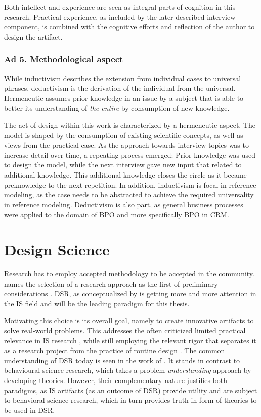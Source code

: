 Both intellect and experience are seen as integral parts of cognition in this research. Practical experience, as included by the later described interview component, is combined with the cognitive efforts and reflection of the author to design the artifact. 

\subsubsection{Ad 5. Methodological aspect}
While inductivism describes the extension from individual cases to universal phrases, deductivism is the derivation of the individual from the universal. Hermeneutic assumes prior knowledge in an issue by a subject that is able to better its understanding of \textit{the entire} by consumption of new knowledge. 

The act of design within this work is characterized by a hermeneutic aspect. The model is shaped by the consumption of existing scientific concepts, as well as views from the practical case. As the approach towards interview topics was to increase detail over time, a repeating process emerged: Prior knowledge was used to design the model, while the next interview gave new input that related to additional knowledge. This additional knowledge closes the circle as it became preknowledge to the next repetition. In addition, inductivism is focal in reference modeling, as the case needs to be abstracted to achieve the required universality in reference modeling. Deductivism is also part, as general business processes were applied to the domain of BPO and more specifically BPO in CRM.  


\section{Design Science}
Research has to employ accepted methodology to be accepted in the community. \citeauthor{creswell2013research} names the selection of a research approach as the first of preliminary considerations \citep{creswell2013research}. \acrfull{DSR}, as conceptualized by \cite{simon1996sciences} is getting more and more attention in the \acrshort{IS} field and will be the leading paradigm for this thesis. 

Motivating this choice is its overall goal, namely to create innovative artifacts to solve real-world problems. This addresses the often criticized limited practical relevance in \acrshort{IS} research \citep{hirschheim}, while still employing the relevant rigor that separates it as a research project from the practice of routine design \citep{Winter2008Hevner}. The common understanding of \acrshort{DSR} today is seen in the work of \cite{Hevner2004}. It stands in contrast to behavioural science research, which takes a problem \textit{understanding} approach by developing theories. However, their complementary nature justifies both paradigms, as IS artifacts (as an outcome of \acrshort{DSR}) provide utility and are subject to behavioral science research, which in turn provides truth in form of theories to be used in \acrshort{DSR}.

